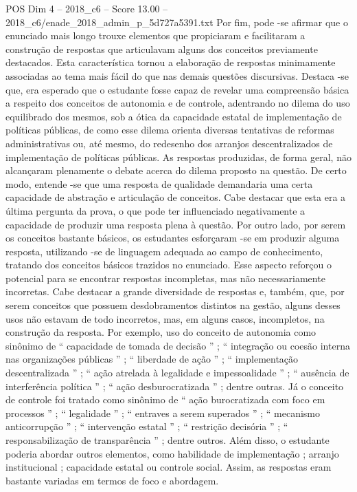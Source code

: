 \begin{textsample}{POS Dim 4 – 2018\_c6 – Score 13.00 – 2018\_c6/enade\_2018\_admin\_p\_5d727a5391.txt}
Por fim, pode -se afirmar que o enunciado mais longo trouxe elementos que propiciaram e facilitaram a construção de respostas que articulavam alguns dos conceitos previamente destacados.
Esta característica tornou a elaboração de respostas minimamente associadas ao tema mais fácil do que nas demais questões discursivas.
Destaca -se que, era esperado que o estudante fosse capaz de revelar uma compreensão básica a respeito dos conceitos de autonomia e de controle, adentrando no dilema do uso equilibrado dos mesmos, sob a ótica da capacidade estatal de implementação de políticas públicas, de como esse dilema orienta diversas tentativas de reformas administrativas ou, até mesmo, do redesenho dos arranjos descentralizados de implementação de políticas públicas.
As respostas produzidas, de forma geral, não alcançaram plenamente o debate acerca do dilema proposto na questão.
De certo modo, entende -se que uma resposta de qualidade demandaria uma certa capacidade de abstração e articulação de conceitos.
Cabe destacar que esta era a última pergunta da prova, o que pode ter influenciado negativamente a capacidade de produzir uma resposta plena à questão.
Por outro lado, por serem os conceitos bastante básicos, os estudantes esforçaram -se em produzir alguma resposta, utilizando -se de linguagem adequada ao campo de conhecimento, tratando dos conceitos básicos trazidos no enunciado.
Esse aspecto reforçou o potencial para se encontrar respostas incompletas, mas não necessariamente incorretas.
Cabe destacar a grande diversidade de respostas e, também, que, por serem conceitos que possuem desdobramentos distintos na gestão, alguns desses usos não estavam de todo incorretos, mas, em alguns casos, incompletos, na construção da resposta.
Por exemplo, uso do conceito de autonomia como sinônimo de “ capacidade de tomada de decisão ” ; “ integração ou coesão interna nas organizações públicas ” ; “ liberdade de ação ” ; “ implementação descentralizada ” ; “ ação atrelada à legalidade e impessoalidade ” ; “ ausência de interferência política ” ; “ ação desburocratizada ” ; dentre outras.
Já o conceito de controle foi tratado como sinônimo de “ ação burocratizada com foco em processos ” ; “ legalidade ” ; “ entraves a serem superados ” ; “ mecanismo anticorrupção ” ; “ intervenção estatal ” ; “ restrição decisória ” ; “ responsabilização de transparência ” ; dentre outros.
Além disso, o estudante poderia abordar outros elementos, como habilidade de implementação ; arranjo institucional ; capacidade estatal ou controle social.
Assim, as respostas eram bastante variadas em termos de foco e abordagem.

\end{textsample}
